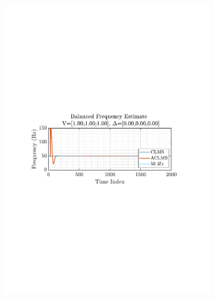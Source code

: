 \documentclass[12pt]{article}
\begin{document}
\begin{figure}[H]
\begin{subfigure}{0.49\textwidth}
					\includegraphics[trim={2.2cm 11.2cm 3.00cm  11.2cm}, clip, width=\textwidth]{../MATLAB/figures/q3_1e_fig02.pdf} 
					\captionsetup{justification=centering}
				\end{subfigure}
				

\end{figure}
\end{document}
